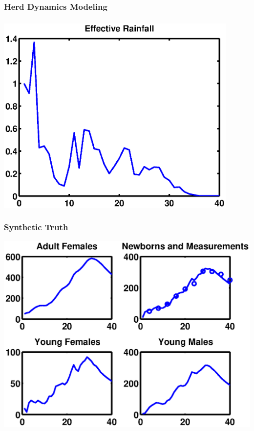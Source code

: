 \documentclass[mathserif]{beamer}
\begin{document}
\begin{frame}
\frametitle{Herd Dynamics Modeling}
\tableofcontents[currentsection]
\end{frame}

\begin{frame}
\begin{center}
\frametitle{\insertsection}
\includegraphics[width=0.9\textwidth]{forcing}
\end{center}
\end{frame}

\begin{frame}
\begin{center}
\frametitle{Synthetic Truth}
\includegraphics[width=1\textwidth]{truth}
\end{center}
\end{frame}
\end{document}
